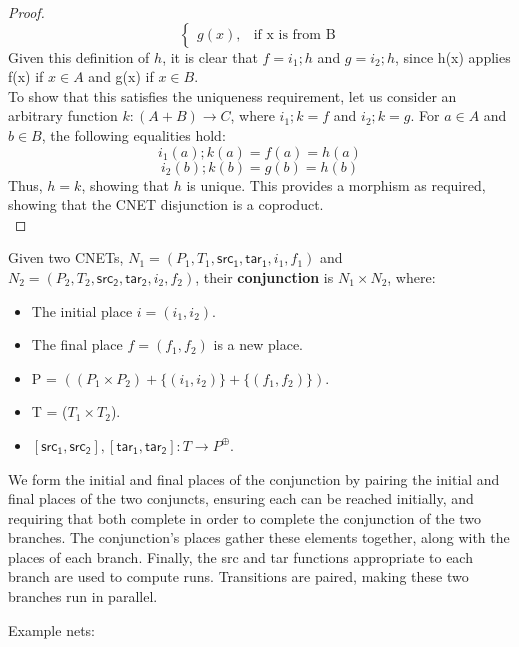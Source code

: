 \begin {proof}
\begin{equation}
\begin{cases}
      g(x), & \text{if x is from B}
    \end{cases}
  \end{equation}
Given this definition of $h$, it is clear that $f = i_1;h$ and $g = i_2;h$, since h(x) applies f(x) if $x \in A$ and g(x) if $x \in B$.\\
To show that this satisfies the uniqueness requirement, let us consider an arbitrary function $k : (A+B) \to C$, where $i_1;k = f$ and $i_2;k = g$. For $a\in A$ and $b\in B$, the following equalities hold:\\ 
\begin{equation}
i_1(a);k(a) = f(a) = h(a) 
\end {equation}
\begin{equation}
i_2(b);k(b) = g(b) = h(b)
\end{equation}
Thus, $h = k$, showing that $h$ is unique. 
This provides a morphism as required, showing that the CNET disjunction is a coproduct.  
\bigskip\\
\end{proof}
\begin{definition}
  \label{def:AND-PN}
  Given two CNETs, $N_1= (P_1, T_1, \mathsf{src_1}, \mathsf{tar_1}, i_1, f_1)$ and $N_2= (P_2, T_2, \mathsf{src_2}, \mathsf{tar_2}, i_2, f_2)$, their \textbf{conjunction} is $N_1 \times N_2$, where: 
\begin{itemize}
\item The initial place $i = (i_1 , i_2)$.
\item The final place $f = (f_1, f_2)$ is a new place.
\item P = $((P_1 \times P_2) + \{(i_1 , i_2)\} + \{(f_1, f_2)\})$.
\item T = ($T_1 \times T_2$).
\item $[\mathsf{src_1}, \mathsf{src_2}], [\mathsf{tar_1}, \mathsf{tar_2}]: T\to P^\oplus$. 
\end{itemize}
We form the initial and final places of the conjunction by pairing the initial and final places of the two conjuncts, ensuring each can be reached initially, and requiring that both complete in order to complete the conjunction of the two branches. The conjunction's places gather these elements together, along with the places of each branch. Finally, the src and tar functions appropriate to each branch are used to compute runs. Transitions are paired, making these two branches run in parallel.   
\end{definition}
\newpage
Example nets:
